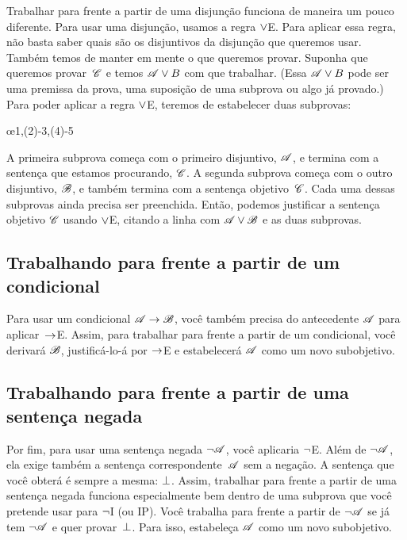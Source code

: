 Trabalhar para frente a partir de uma disjunção funciona de maneira um pouco diferente. Para usar uma disjunção, usamos a regra $\vee$E. Para aplicar essa regra, não basta saber quais são os disjuntivos da disjunção que queremos usar. Também temos de manter em mente o que queremos provar. Suponha que queremos provar~$\mathscr{C}$ e temos $\mathscr{A} \vee B$ com que trabalhar. (Essa $\mathscr{A} \vee B$ pode ser uma premissa da prova, uma suposição de uma subprova ou algo já provado.) Para poder aplicar a regra $\vee$E, teremos de estabelecer duas subprovas:
\begin{fitchproof}
	\open
	\ellipsesline 
	\close 
	\open
	\ellipsesline
	\close
	\oe{1,(2)-3,(4)-5} 
\end{fitchproof} 
A primeira subprova começa com o primeiro disjuntivo, $\mathscr{A}$, e termina com a sentença que estamos procurando, $\mathscr{C}$. A segunda subprova começa com o outro disjuntivo, $\mathscr{B}$, e também termina com a sentença objetivo~$\mathscr{C}$. Cada uma dessas subprovas ainda precisa ser preenchida. Então, podemos justificar a sentença objetivo $\mathscr{C}$ usando $\vee$E, citando a linha com $\mathscr{A} \vee \mathscr{B}$ e as duas subprovas.

\subsection*{Trabalhando para frente a partir de um condicional}

Para usar um condicional $\mathscr{A} \rightarrow \mathscr{B}$, você também precisa do antecedente $\mathscr{A}$ para aplicar~$\rightarrow$E. Assim, para trabalhar para frente a partir de um condicional, você derivará $\mathscr{B}$, justificá-lo-á por $\rightarrow$E e estabelecerá $\mathscr{A}$ como um novo subobjetivo.
\begin{fitchproof}
	\ellipsesline 
\end{fitchproof}

\subsection*{Trabalhando para frente a partir de uma sentença negada}

Por fim, para usar uma sentença negada $\neg \mathscr{A}$, você aplicaria $\neg$E. Além de $\neg \mathscr{A}$, ela exige também a sentença correspondente~$\mathscr{A}$ sem a negação. A sentença que você obterá é sempre a mesma: $\bot$. Assim, trabalhar para frente a partir de uma sentença negada funciona especialmente bem dentro de uma subprova que você pretende usar para $\neg$I (ou IP). Você trabalha para frente a partir de $\neg \mathscr{A}$ se já tem $\neg \mathscr{A}$ e quer provar~$\bot$. Para isso, estabeleça $\mathscr{A}$ como um novo subobjetivo.
\begin{fitchproof}
	\ellipsesline 
\end{fitchproof}

